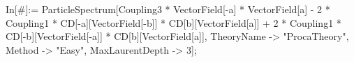 In[#]:= ParticleSpectrum[Coupling3 * VectorField[-a] * VectorField[a] - 2 * Coupling1 * CD[-a][VectorField[-b]] * CD[b][VectorField[a]] + 2 * Coupling1 * CD[-b][VectorField[-a]] * CD[b][VectorField[a]], TheoryName -> "ProcaTheory", Method -> "Easy", MaxLaurentDepth -> 3]; 